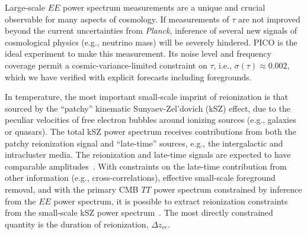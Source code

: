 \documentclass[PICOReport.tex]{subfiles}
\begin{document}
Large-scale $EE$ power spectrum measurements are a unique and crucial observable for many aspects of cosmology.  
If measurements of $\tau$ are not improved beyond the current uncertainties from {\em Planck}, inference of several new signals 
of cosmological physics (e.g., neutrino mass) will be severely hindered.  PICO is the ideal experiment to make this measurement.  
Its noise level and frequency coverage permit a cosmic-variance-limited constraint on $\tau$, i.e., $\sigma(\tau) \approx 0.002$, which we have verified with explicit forecasts including foregrounds. 

In temperature, the most important small-scale imprint of reionization is that sourced by the ``patchy'' kinematic Sunyaev-Zel'dovich (kSZ) effect, due to the peculiar velocities of free electron bubbles around ionizing sources (e.g., galaxies or quasars).  The total kSZ power spectrum receives contributions from both the patchy reionization signal and ``late-time'' sources, e.g., the intergalactic and 
intracluster media.  The reionization and late-time signals are expected to have comparable 
amplitudes~\citep{Shaw2012,MMS2012,Battaglia2013}.  With constraints on the late-time contribution from other 
information (e.g., cross-correlations), effective small-scale foreground removal, and with the primary CMB $TT$ power 
spectrum constrained by inference from the $EE$ power spectrum, it is possible to extract reionization constraints from the 
small-scale kSZ power spectrum~\citep{calabrese/etal/2014}.  The most directly constrained quantity is the duration of reionization, $\Delta z_{re}$. 
\end{document}
